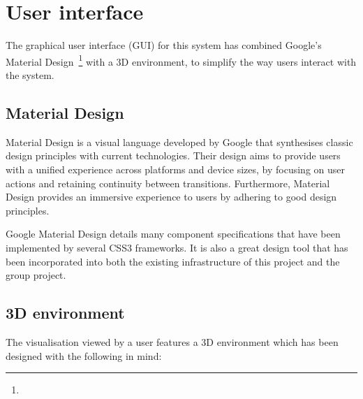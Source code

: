 \section{User interface} {
\label{sec:user_interface}

	The graphical user interface (GUI) for this system has combined Google's Material Design~\footnote{} with a 3D environment, to simplify the way users interact with the system.

	\subsection{Material Design} {
	\label{sec:material_design}

		Material Design is a visual language developed by Google that synthesises classic design principles with current technologies. Their design aims to provide users with a unified experience across platforms and device sizes, by focusing on user actions and retaining continuity between transitions. Furthermore, Material Design provides an immersive experience to users by adhering to good design principles.

		Google Material Design details many component specifications that have been implemented by several CSS3 frameworks. It is also a great design tool that has been incorporated into both the existing infrastructure of this project and the group project.


	}

	\subsection{3D environment} {
	\label{sec:3d_environment}

		The visualisation viewed by a user features a 3D environment which has been designed with the following in mind:

}}
